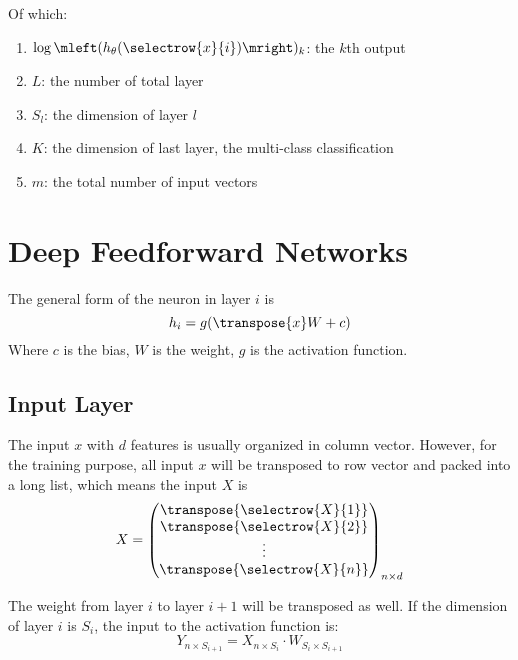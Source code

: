 Of which:
\begin{enumerate}
    \item $\log \mleft( h_\theta (\selectrow{x}{i}) \mright)_k$: the $k$th output
    \item $L$: the number of total layer
    \item $S_l$: the dimension of layer $l$
    \item $K$: the dimension of last layer, the multi-class classification
    \item $m$: the total number of input vectors
\end{enumerate}



\section{Deep Feedforward Networks}



The general form of the neuron in layer $i$ is 
\begin{equation}
    h_i = g(\transpose{x} W + c)
\end{equation}
Where $c$ is the bias, $W$ is the weight, $g$ is the activation function.


\subsection{Input Layer}

\begin{definition}
    The input $x$ with $d$ features is usually organized in column vector. However, for the training purpose, all input $x$ will be transposed to row vector and packed into a long list, which means the input $X$ is
\begin{equation}
    X = \begin{pmatrix}
        \transpose{\selectrow{X}{1}} \\
        \transpose{\selectrow{X}{2}} \\
        \vdots \\
        \transpose{\selectrow{X}{n}} \\
    \end{pmatrix}_{n \times d}
\end{equation}
\end{definition}



The weight from layer $i$ to layer $i+1$ will be transposed as well. If the dimension of layer $i$ is $S_i$, the input to the activation function is:
\begin{equation}
    Y_{n \times S_{i+1}} = X_{n \times S_{i}} \cdot W_{S_{i} \times S_{i+1}}
\end{equation}



